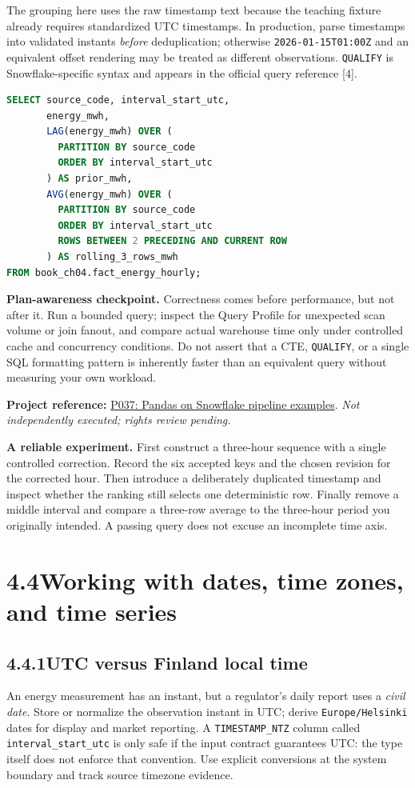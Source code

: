 \documentclass[11pt,twoside]{article}
\newcommand{\topic}[2]{\subsection*{#1\quad #2}}
\newcommand{\repo}[2]{\par\begingroup\fontsize{8.0}{9.6}\selectfont\sffamily\color{inkgray}\textbf{Project reference:} \href{#2}{#1}. \textit{Not independently executed; rights review pending.}\par\endgroup}
\begin{document}
The grouping here uses the raw timestamp text because the teaching fixture already requires standardized UTC timestamps. In production, parse timestamps into validated instants \emph{before} deduplication; otherwise \texttt{2026-01-15T01:00Z} and an equivalent offset rendering may be treated as different observations. \texttt{QUALIFY} is Snowflake-specific syntax and appears in the official query reference [4].

\begin{lstlisting}[language=SQL,caption={Explicit rolling frame on a complete hourly series.}]
SELECT source_code, interval_start_utc,
       energy_mwh,
       LAG(energy_mwh) OVER (
         PARTITION BY source_code
         ORDER BY interval_start_utc
       ) AS prior_mwh,
       AVG(energy_mwh) OVER (
         PARTITION BY source_code
         ORDER BY interval_start_utc
         ROWS BETWEEN 2 PRECEDING AND CURRENT ROW
       ) AS rolling_3_rows_mwh
FROM book_ch04.fact_energy_hourly;
\end{lstlisting}

\textbf{Plan-awareness checkpoint.} Correctness comes before performance, but not after it. Run a bounded query; inspect the Query Profile for unexpected scan volume or join fanout, and compare actual warehouse time only under controlled cache and concurrency conditions. Do not assert that a CTE, \texttt{QUALIFY}, or a single SQL formatting pattern is inherently faster than an equivalent query without measuring your own workload.
\repo{P037: Pandas on Snowflake pipeline examples}{https://github.com/Snowflake-Labs/sfguide-data-engineering-pipelines-with-pandas-on-snowflake}


\textbf{A reliable experiment.} First construct a three-hour sequence with a single controlled correction. Record the six accepted keys and the chosen revision for the corrected hour. Then introduce a deliberately duplicated timestamp and inspect whether the ranking still selects one deterministic row. Finally remove a middle interval and compare a three-row average to the three-hour period you originally intended. A passing query does not excuse an incomplete time axis.

\newpage
\section*{4.4\quad Working with dates, time zones, and time series}
\topic{4.4.1}{UTC versus Finland local time}
An energy measurement has an instant, but a regulator's daily report uses a \emph{civil date}. Store or normalize the observation instant in UTC; derive \texttt{Europe/Helsinki} dates for display and market reporting. A \texttt{TIMESTAMP\_NTZ} column called \texttt{interval\_start\_utc} is only safe if the input contract guarantees UTC: the type itself does not enforce that convention. Use explicit conversions at the system boundary and track source timezone evidence.
\end{document}
